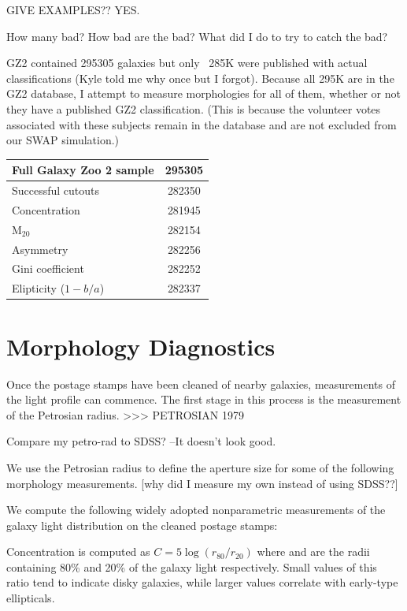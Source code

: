  GIVE EXAMPLES??  YES. 

 How many bad? How bad are the bad? What did I do to try to catch the bad? 

GZ2 contained 295305 galaxies but only ~285K were published with actual classifications (Kyle told me why once but I forgot). Because all 295K are in the GZ2 database, I attempt to measure morphologies for all of them, whether or not they have a published GZ2 classification. (This is because the volunteer votes associated with these subjects remain in the database and are not excluded from our SWAP simulation.)

\begin{table}
	\begin{tabular}{|l|c|}
		\hline
		Full Galaxy Zoo 2 sample 	& 295305 \\
		\hline
		\hline
		Successful cutouts 			& 282350 \\
		Concentration				& 281945 \\
		M$_{20}$					& 282154 \\
		Asymmetry 					& 282256 \\
		Gini coefficient			& 282252 \\
		Elipticity ($1 - b/a$)		& 282337 \\
		\hline
	\end{tabular}
\end{table}

\section{Morphology Diagnostics}
Once the postage stamps have been cleaned of nearby galaxies, measurements of the light profile can commence. The first stage in this process is the measurement of the Petrosian radius. 
>>> PETROSIAN 1979

Compare my petro-rad to SDSS? --It doesn't look good. 

We use the Petrosian radius to define the aperture size for some of the following morphology measurements. [why did I measure my own instead of using SDSS??]

We compute the following widely adopted nonparametric measurements of the galaxy light distribution on the cleaned postage stamps:

Concentration is computed as $C = 5\log(r_{80}/ r_{20})$ where  and  are the
radii containing 80\% and 20\% of the galaxy light respectively.  Small values of this ratio 
tend to indicate disky galaxies, while larger values correlate with early-type ellipticals. 

